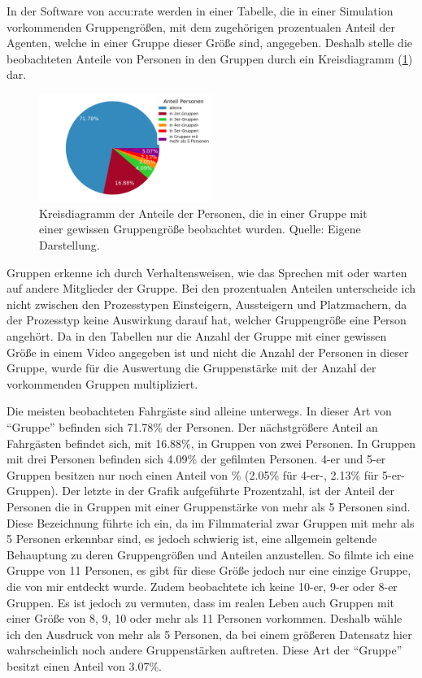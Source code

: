 In der Software von accu:rate werden in einer Tabelle, die in einer Simulation vorkommenden Gruppengrößen, mit dem zugehörigen prozentualen Anteil der Agenten, welche in einer Gruppe dieser Größe sind, angegeben. Deshalb stelle die beobachteten Anteile von Personen in den Gruppen durch ein Kreisdiagramm (\figurename \ref{fig:AnteileGruppen}) dar.
\begin{figure}[H]
	\centering
		\includegraphics[width=0.5\textwidth]{pictures/data_evaluation/groups/groups.png}
	\caption{Kreisdiagramm der Anteile der Personen, die in einer Gruppe mit einer gewissen Gruppengröße beobachtet wurden. Quelle: Eigene Darstellung.}
	\label{fig:AnteileGruppen}
\end{figure}
Gruppen erkenne ich durch Verhaltensweisen, wie das Sprechen mit oder warten auf andere Mitglieder der Gruppe. Bei den prozentualen Anteilen unterscheide ich nicht zwischen den Prozesstypen Einsteigern, Aussteigern und Platzmachern, da der Prozesstyp keine Auswirkung darauf hat, welcher Gruppengröße eine Person angehört. Da in den Tabellen nur die Anzahl der Gruppe mit einer gewissen Größe in einem Video angegeben ist und nicht die Anzahl der Personen in dieser Gruppe, wurde für die Auswertung die Gruppenstärke mit der Anzahl der vorkommenden Gruppen multipliziert. 

Die meisten beobachteten Fahrgäste sind alleine unterwegs. In dieser Art von "`Gruppe"' befinden sich 71.78\% der Personen. Der nächstgrößere Anteil an Fahr\-gäs\-ten befindet sich, mit 16.88\%, in Gruppen von zwei Personen. In Gruppen mit drei Personen befinden sich 4.09\% der gefilmten Personen. 4-er und 5-er Gruppen besitzen nur noch einen Anteil von \% (2.05\% für 4-er-, 2.13\% für 5-er-Gruppen). Der letzte in der Grafik aufgeführte Prozentzahl, ist der Anteil der Personen die in Gruppen mit einer Gruppenstärke von mehr als 5 Personen sind. Diese Bezeichnung führte ich ein, da im Filmmaterial zwar Gruppen mit mehr als 5 Personen erkennbar sind, es jedoch schwierig ist, eine allgemein geltende Behauptung zu deren Gruppengrößen und Anteilen anzustellen. So filmte ich \zB eine Gruppe von 11 Personen, es gibt für diese Größe jedoch nur eine einzige Gruppe, die von mir entdeckt wurde. Zudem beobachtete ich keine 10-er, 9-er oder 8-er Gruppen. Es ist jedoch zu vermuten, dass im realen Leben auch Gruppen mit einer Größe von 8, 9, 10 oder mehr als 11 Personen vorkommen. Deshalb wähle ich den Ausdruck von mehr als 5 Personen, da bei einem größeren Datensatz hier wahrscheinlich noch andere Gruppenstärken auftreten. Diese Art der "`Gruppe"' besitzt einen Anteil von 3.07\%.

